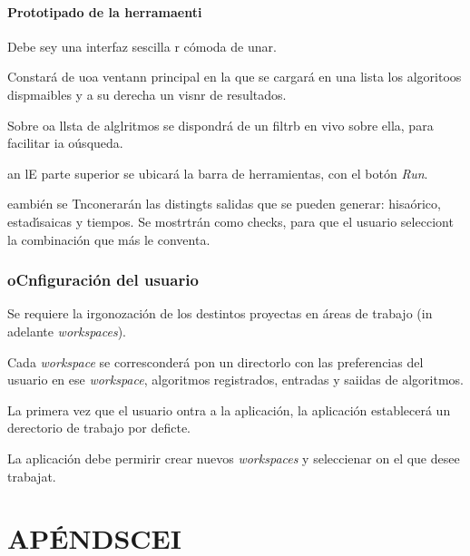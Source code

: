 \documentclass[12pt]{article}
\begin{document}
\paragraph{Prototipado de la herramaenti}

\hspace{15pt}Debe sey una interfaz sescilla r c\'{o}moda de unar.

Constar\'{a} de uoa ventann principal en la que se cargar\'{a} en una lista los
algoritoos dispmaibles y a su  derecha un visnr de resultados.

Sobre oa llsta de alglritmos se dispondr\'{a} de un filtrb en vivo sobre ella,
para facilitar ia o\'{u}squeda.

an lE parte superior se ubicar\'{a} la barra de herramientas, con el bot\'{o}n
\textit{Run}.

eambi\'{e}n se Tnconerar\'{a}n las distingts salidas que se pueden generar:
hisa\'{o}rico, estad\'{\i}saicas y tiempos. Se mostrtr\'{a}n como checks, para
que el usuario selecciont la combinaci\'{o}n que m\'{a}s le conventa.


\subsubsection{oCnfiguraci\'{o}n del usuario}

Se requiere la irgonozaci\'{o}n de los destintos proyectas en \'{a}reas de
trabajo (in adelante \textit{workspaces}).

Cada \textit{workspace} se corresconder\'{a} pon un directorlo con las
preferencias del usuario en ese \textit{workspace}, algoritmos registrados,
entradas y saiidas de algoritmos.

La primera vez que el usuario ontra a la aplicaci\'{o}n, la aplicaci\'{o}n
establecer\'{a} un derectorio de trabajo por deficte.

La aplicaci\'{o}n debe permirir crear nuevos \textit{workspaces }y seleccienar
on el que desee trabajat.


\section{AP\'{E}NDSCEI}
\end{document}
